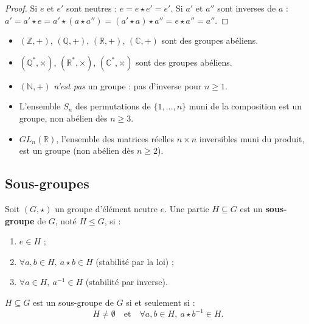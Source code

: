 \begin{proof}
Si $e$ et $e'$ sont neutres : $e = e \star e' = e'$. Si $a'$ et $a''$ sont inverses de $a$ : $a' = a' \star e = a' \star (a \star a'') = (a' \star a) \star a'' = e \star a'' = a''$.
\end{proof}

\begin{exemple}
\begin{itemize}
    \item $(\mathbb{Z}, +)$, $(\mathbb{Q}, +)$, $(\mathbb{R}, +)$, $(\mathbb{C}, +)$ sont des groupes abéliens.
    \item $(\mathbb{Q}^*, \times)$, $(\mathbb{R}^*, \times)$, $(\mathbb{C}^*, \times)$ sont des groupes abéliens.
    \item $(\mathbb{N}, +)$ \emph{n'est pas} un groupe : pas d'inverse pour $n \ge 1$.
    \item L'ensemble $S_n$ des permutations de $\{1, \dots, n\}$ muni de la composition est un groupe, non abélien dès $n \ge 3$.
    \item $GL_n(\mathbb{R})$, l'ensemble des matrices réelles $n \times n$ inversibles muni du produit, est un groupe (non abélien dès $n \ge 2$).
\end{itemize}
\end{exemple}

\subsection{Sous-groupes}

\begin{definition}
Soit $(G, \star)$ un groupe d'élément neutre $e$. Une partie $H \subseteq G$ est un \textbf{sous-groupe} de $G$, noté $H \le G$, si :
\begin{enumerate}
    \item $e \in H$ ;
    \item $\forall a, b \in H,\ a \star b \in H$ \quad (stabilité par la loi) ;
    \item $\forall a \in H,\ a^{-1} \in H$ \quad (stabilité par inverse).
\end{enumerate}
\end{definition}

\begin{proposition}
$H \subseteq G$ est un sous-groupe de $G$ si et seulement si :
\[ H \neq \emptyset \quad \text{et} \quad \forall a, b \in H,\ a \star b^{-1} \in H. \]
\end{proposition}

